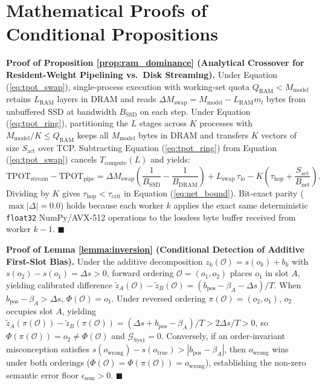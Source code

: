 \documentclass[10pt,a4paper]{article}
\begin{document}
\newpage
\appendix

\section{Mathematical Proofs of Conditional Propositions}
\label{app:proofs}

\textbf{Proof of Proposition \ref{prop:ram_dominance} (Analytical Crossover for Resident-Weight Pipelining vs.\ Disk Streaming).}
Under Equation (\ref{eq:tpot_swap}), single-process execution with working-set quota $Q_{\text{RAM}} < M_{\text{model}}$ retains $L_{\text{RAM}}$ layers in DRAM and reads $\Delta M_{\text{swap}} = M_{\text{model}} - L_{\text{RAM}}m_l$ bytes from unbuffered SSD at bandwidth $B_{\text{SSD}}$ on each step. Under Equation (\ref{eq:tpot_ring}), partitioning the $L$ stages across $K$ processes with $M_{\text{model}}/K \le Q_{\text{RAM}}$ keeps all $M_{\text{model}}$ bytes in DRAM and transfers $K$ vectors of size $S_{\text{act}}$ over TCP. Subtracting Equation (\ref{eq:tpot_ring}) from Equation (\ref{eq:tpot_swap}) cancels $T_{\text{compute}}(L)$ and yields:
\begin{equation}
\text{TPOT}_{\text{stream}} - \text{TPOT}_{\text{pipe}} = \Delta M_{\text{swap}}\!\left(\frac{1}{B_{\text{SSD}}} - \frac{1}{B_{\text{DRAM}}}\right) + L_{\text{swap}}\,\tau_{\text{io}} - K\!\left(\tau_{\text{hop}} + \frac{S_{\text{act}}}{B_{\text{net}}}\right).
\end{equation}
Dividing by $K$ gives $\tau_{\text{hop}} < \tau_{\text{crit}}$ in Equation (\ref{eq:net_bound}). Bit-exact parity ($\max|\Delta| = 0.0$) holds because each worker $k$ applies the exact same deterministic \texttt{float32} NumPy/AVX-512 operations to the lossless byte buffer received from worker $k-1$. $\blacksquare$

\textbf{Proof of Lemma \ref{lemma:inversion} (Conditional Detection of Additive First-Slot Bias).}
Under the additive decomposition $z_k(\mathcal{O}) = s(o_k) + b_k$ with $s(o_2) - s(o_1) = \Delta s > 0$, forward ordering $\mathcal{O} = (o_1, o_2)$ places $o_1$ in slot $A$, yielding calibrated difference $\tilde{z}_A(\mathcal{O}) - \tilde{z}_B(\mathcal{O}) = (b_{\text{pos}} - \beta_A - \Delta s)/T$. When $b_{\text{pos}} - \beta_A > \Delta s$, $\Phi(\mathcal{O}) = o_1$. Under reversed ordering $\pi(\mathcal{O}) = (o_2, o_1)$, $o_2$ occupies slot $A$, yielding $\tilde{z}_A(\pi(\mathcal{O})) - \tilde{z}_B(\pi(\mathcal{O})) = (\Delta s + b_{\text{pos}} - \beta_A)/T > 2\Delta s / T > 0$, so $\Phi(\pi(\mathcal{O})) = o_2 \neq \Phi(\mathcal{O})$ and $\mathcal{G}_{\text{Sys1}} = 0$. Conversely, if an order-invariant misconception satisfies $s(o_{\text{wrong}}) - s(o_{\text{true}}) > |b_{\text{pos}} - \beta_A|$, then $o_{\text{wrong}}$ wins under both orderings ($\Phi(\mathcal{O}) = \Phi(\pi(\mathcal{O})) = o_{\text{wrong}}$), establishing the non-zero semantic error floor $\epsilon_{\text{sem}} > 0$. $\blacksquare$
\end{document}
